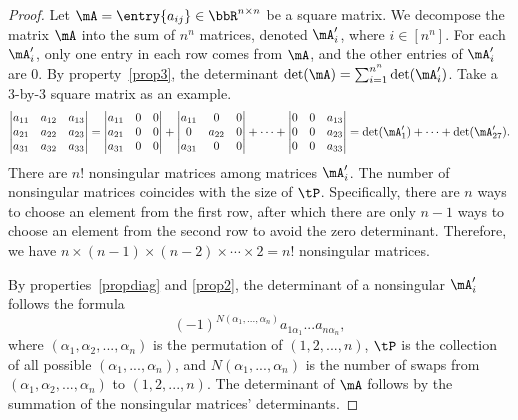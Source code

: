 \documentclass[11pt]{article}
\theoremstyle{plain}
\theoremstyle{definition}
\begin{document}
\begin{proof}
	Let $\mA = \entry{a_{ij}} \in \bbR^{n \times n}$ be a square matrix. We decompose the  matrix $\mA$ into the sum of $n^n$ matrices, denoted $\mA'_i$, where $i \in [n^n]$. For each $\mA'_i$, only one entry in each row comes from $\mA$, and the other entries of $\mA'_i $ are 0. By property~\ref{prop3}, the determinant $\det(\mA) = \sum_{i=1}^{n^n} \det(\mA'_i)$. Take a 3-by-3 square matrix as an example.
	\begin{align}
		\begin{vmatrix}
			a_{11} & a_{12} & a_{13}\\
			a_{21} & a_{22} & a_{23}\\
			a_{31} & a_{32} & a_{33}
		\end{vmatrix} = \begin{vmatrix}
			a_{11} & 0& 0\\
			a_{21} & 0 & 0\\
			a_{31} &0 & 0
		\end{vmatrix} + \begin{vmatrix}
			a_{11} & 0& 0\\
			0 & a_{22} & 0\\
			a_{31} &0 & 0
		\end{vmatrix} + \cdots +\begin{vmatrix}
			0 & 0& a_{13}\\
			0& 0 & a_{23}\\
			 0&0 & a_{33}
		\end{vmatrix} = \det(\mA'_1)  +\cdots + \det(\mA'_{27}).
	\end{align}
	There are $n!$ nonsingular matrices among matrices $\mA'_i$. The number of nonsingular matrices coincides with the size of $\tP$. Specifically, there are $n$ ways to choose an element from the first row, after which there are only $n-1$ ways to choose an element from the second row to avoid the zero determinant. Therefore, we have $n \times (n-1) \times (n-2) \times \cdots \times 2 = n!$ nonsingular matrices.
	
	By properties~\ref{propdiag} and \ref{prop2}, the determinant of a nonsingular $\mA'_i$ follows the formula \[(-1)^{N(\alpha_1,...,\alpha_n)}  a_{1\alpha_1} ... a_{n \alpha_n},\]
	where $(\alpha_1, \alpha_2, ...,\alpha_n)$ is the permutation of $(1,2,...,n)$, $\tP$ is the collection of all possible  $(\alpha_1,...,\alpha_n)$, and $N(\alpha_1,...,\alpha_n)$ is the number of swaps from $(\alpha_1,\alpha_2,...,\alpha_n)$  to $(1,2,...,n)$. The determinant of $\mA$ follows by the summation of the nonsingular matrices' determinants.
\end{proof}
\end{document}
